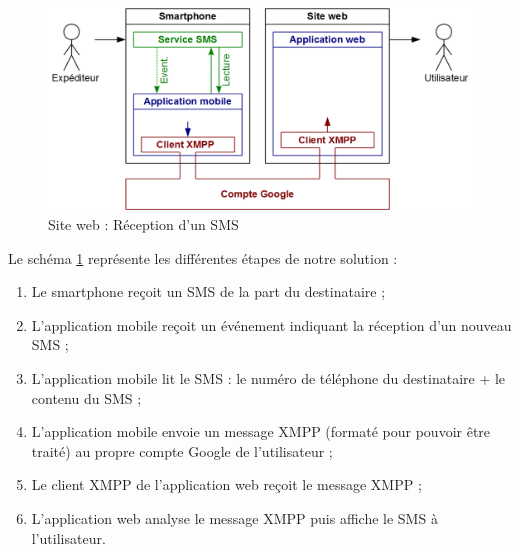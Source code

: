 \begin{figure}[!h]
	\center
	\includegraphics[scale=0.5]{img/schemaFonctionnement_siteWeb_reception.png}
	\caption{Site web : Réception d'un SMS}
	\label{schemaFonctionnement_siteWeb_reception}
\end{figure}
Le schéma \ref{schemaFonctionnement_siteWeb_reception} représente les différentes étapes de notre solution :
\begin{enumerate}
	\item Le smartphone reçoit un SMS de la part du destinataire ;
	\item L'application mobile reçoit un événement indiquant la réception d'un nouveau SMS ;
	\item L'application mobile lit le SMS : le numéro de téléphone du destinataire + le contenu du SMS ;
	\item L'application mobile envoie un message XMPP (formaté pour pouvoir être traité) au propre compte Google de l'utilisateur ;
	\item Le client XMPP de l'application web reçoit le message XMPP ;
	\item L'application web analyse le message XMPP puis affiche le SMS à l'utilisateur.
\\
\end{enumerate}






